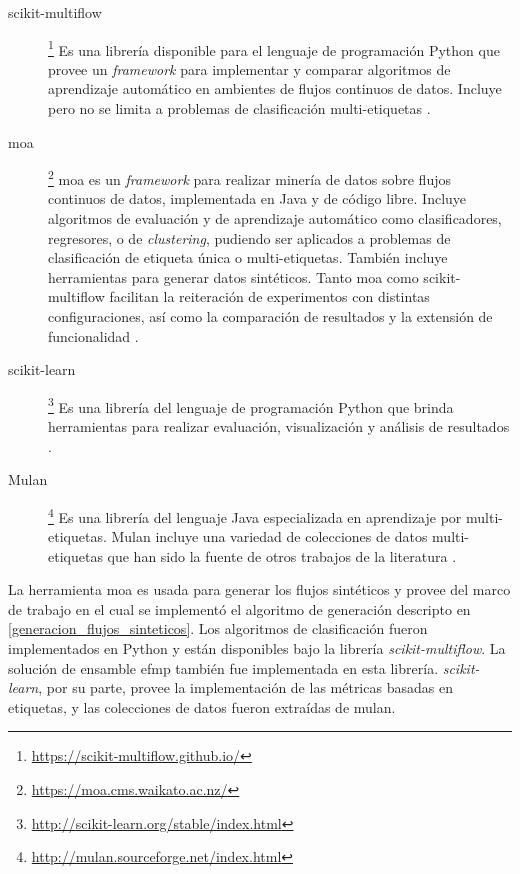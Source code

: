 \begin{description}

	\item[scikit-multiflow]\footnote{\url{https://scikit-multiflow.github.io/}} Es
	      una librería disponible para el lenguaje de programación Python que provee
	      un \textit{framework} para implementar y comparar algoritmos de aprendizaje
	      automático en ambientes de flujos continuos de datos. Incluye pero no se
	      limita a problemas de clasificación multi-etiquetas
	      \cite{montiel_scikit-multiflow_2018}.

	\item[\acrshort{moa}]\footnote{\url{https://moa.cms.waikato.ac.nz/}}
	      \acrfull{moa} es un \textit{framework} para realizar minería de datos sobre
	      flujos continuos de datos, implementada en Java y de código libre.  Incluye
	      algoritmos de evaluación y de aprendizaje automático como clasificadores,
	      regresores, o de \textit{clustering}, pudiendo ser aplicados a problemas de
	      clasificación de etiqueta única o multi-etiquetas.  También incluye
	      herramientas para generar datos sintéticos. Tanto \acrshort{moa} como
	      scikit-multiflow facilitan la reiteración de experimentos con distintas
	      configuraciones, así como la comparación de resultados y la extensión de
	      funcionalidad \cite{bifet_moa_2010}.

	\item[scikit-learn]\footnote{\url{http://scikit-learn.org/stable/index.html}}
	      Es una librería del lenguaje de programación Python que brinda
	      herramientas para realizar evaluación, visualización y análisis de
	      resultados \cite{pedregosa_scikit-learn_2018}.

	\item[Mulan]\footnote{\url{http://mulan.sourceforge.net/index.html}} Es una
	      librería del lenguaje Java especializada en aprendizaje por
	      multi-etiquetas. Mulan incluye una variedad de colecciones de datos
	      multi-etiquetas que han sido la fuente de otros trabajos de la literatura
	      \cite{tsoumakas_mulan_2011}.

\end{description} 

La herramienta \acrshort{moa} es usada para generar los flujos sintéticos y
provee del marco de trabajo en el cual se implementó el algoritmo de generación
descripto en \ref{generacion_flujos_sinteticos}. Los algoritmos de clasificación
fueron implementados en Python y están disponibles bajo la librería
\textit{scikit-multiflow}. La solución de ensamble \acrshort{efmp} también fue
implementada en esta librería. \textit{scikit-learn}, por su parte, provee la
implementación de las métricas basadas en etiquetas, y las colecciones de datos
fueron extraídas de mulan.

